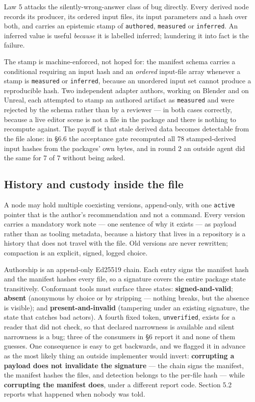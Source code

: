 \documentclass[10pt,twocolumn,letterpaper]{article}
\newcommand{\code}[1]{\texttt{\small #1}}
\begin{document}
Law 5 attacks the silently-wrong-answer class of bug directly. Every derived node records its producer, its ordered input files, its input parameters and a hash over both, and carries an epistemic stamp of \code{authored}, \code{measured} or \code{inferred}. An inferred value is useful \emph{because} it is labelled inferred; laundering it into fact is the failure.

The stamp is machine-enforced, not hoped for: the manifest schema carries a conditional requiring an input hash and an \emph{ordered} input-file array whenever a stamp is \code{measured} or \code{inferred}, because an unordered input set cannot produce a reproducible hash. Two independent adapter authors, working on Blender and on Unreal, each attempted to stamp an authored artifact as \code{measured} and were rejected by the schema rather than by a reviewer --- in both cases correctly, because a live editor scene is not a file in the package and there is nothing to recompute against. The payoff is that stale derived data becomes detectable from the file alone: in \S6.6 the acceptance gate recomputed all 78 stamped-derived input hashes from the packages' own bytes, and in round 2 an outside agent did the same for 7 of 7 without being asked.

\subsection{History and custody inside the file}

A node may hold multiple coexisting versions, append-only, with one \code{active} pointer that is the author's recommendation and not a command. Every version carries a mandatory work note --- one sentence of why it exists --- as payload rather than as tooling metadata, because a history that lives in a repository is a history that does not travel with the file. Old versions are never rewritten; compaction is an explicit, signed, logged choice.

Authorship is an append-only Ed25519 chain. Each entry signs the manifest hash and the manifest hashes every file, so a signature covers the entire package state transitively. Conformant tools must surface three states: \textbf{signed-and-valid}; \textbf{absent} (anonymous by choice or by stripping --- nothing breaks, but the absence is visible); and \textbf{present-and-invalid} (tampering under an existing signature, the state that catches bad actors). A fourth fixed token, \code{unverified}, exists for a reader that did not check, so that declared narrowness is available and silent narrowness is a bug; three of the consumers in \S6 report it and none of them guesses. One consequence is easy to get backwards, and we flagged it in advance as the most likely thing an outside implementer would invert: \textbf{corrupting a payload does not invalidate the signature} --- the chain signs the manifest, the manifest hashes the files, and detection belongs to the per-file hash --- while \textbf{corrupting the manifest does}, under a different report code. Section 5.2 reports what happened when nobody was told.
\end{document}

